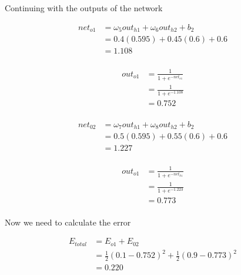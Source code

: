 \documentclass[10pt,a4paper]{article}
\begin{document}
Continuing with the outputs of the network

\begin{equation}
\begin{split}
net_{o1} &= \omega_5 out_{h1} + \omega_6 out_{h2} + b_2 \\
         &= 0.4(0.595) + 0.45(0.6) + 0.6 \\
         &= 1.108\\
\end{split}
\end{equation}

\begin{equation}
\begin{split}
out_{o1} &= \frac{1}{1+e^{-net_{o1}}}\\ 
         &= \frac{1}{1+e^{-1.108}}\\ 
         &= 0.752\\
\end{split}
\end{equation}

\begin{equation}
\begin{split}
net_{02} &= \omega_7 out_{h1} + \omega_8 out_{h2} + b_2 \\
         &= 0.5(0.595) + 0.55(0.6) + 0.6 \\
         &= 1.227\\
\end{split}
\end{equation}

\begin{equation}
\begin{split}
out_{o1} &= \frac{1}{1+e^{-net_{h1}}}\\ 
         &= \frac{1}{1+e^{-1.223}}\\ 
         &= 0.773\\
\end{split}
\end{equation}

Now we need to calculate the error

\begin{equation}
\begin{split}
E_{total} &= E_{o1} + E_{02} \\
          &= \frac{1}{2}(0.1-0.752)^2 + \frac{1}{2}(0.9 - 0.773)^2 \\
          &= 0.220 \\
\end{split}
\end{equation}
\end{document}
